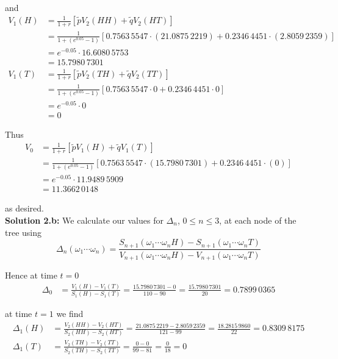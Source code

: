 \documentclass[12pt]{article}
\begin{document}
and
\begin{align*}
	V_1(H) &= \frac{1}{1 + r}[\tilde{p}V_2(HH) + \tilde{q}V_2(HT)] \\
	&= \frac{1}{1 + (e^{0.05} - 1)} [0.7563\,5547 \cdot (21.0875\,2219) + 0.2346\,4451 \cdot (2.8059\,2359) ] \\
	&= e^{-0.05} \cdot 16.6080\,5753 \\
	&= 15.7980\,7301 \\
	V_1(T) &= \frac{1}{1 + r}[\tilde{p}V_2(TH) + \tilde{q}V_2(TT)] \\
	&= \frac{1}{1 + (e^{0.05} - 1)} [0.7563\,5547 \cdot 0 + 0.2346\,4451 \cdot 0] \\
	&= e^{-0.05} \cdot 0 \\
	&= 0
\end{align*}

Thus
\begin{align*}
	V_0 &= \frac{1}{1 + r}[ \tilde{p} V_1(H) + \tilde{q}V_1(T)] \\
	&= \frac{1}{1 + (e^{0.05} - 1)} [0.7563\,5547 \cdot (15.7980\,7301) + 0.2346\,4451 \cdot (0)] \\
	&= e^{-0.05} \cdot 11.9489\,5909 \\
	&= 11.3662\,0148
\end{align*}

as desired. \\

{\bf Solution 2.b:} We calculate our values for $\Delta_n$, $0 \leq n \leq 3$, at each node of the tree using
\begin{equation*}
	\Delta_n(\omega_1\cdots\omega_n) = \frac{ S_{n + 1}(\omega_1\cdots\omega_n H) - S_{n + 1}(\omega_1\cdots\omega_n T) }{ V_{n + 1}(\omega_1\cdots\omega_n H) - V_{n + 1}(\omega_1\cdots\omega_n T) }
\end{equation*}

Hence at time $t = 0$
\begin{align*}
	\Delta_0 &= \frac{V_1(H) - V_1(T)}{S_1(H) - S_1(T)} = \frac{15.7980\,7301 - 0}{110 - 90} = \frac{15.7980\,7301}{20} = 0.7899\,0365
\end{align*}

at time $t = 1$ we find
\begin{align*}
	\Delta_1(H) &= \frac{V_2(HH) - V_2(HT)}{S_2(HH) - S_2(HT)} = \frac{21.0875\,2219 - 2.8059\,2359}{121 - 99} = \frac{18.2815\,9860}{22} = 0.8309\,8175 \\
	\Delta_1(T) &= \frac{V_2(TH) - V_2(TT)}{S_2(TH) - S_2(TT)} = \frac{0 - 0}{99 - 81} = \frac{0}{18} = 0
\end{align*}
\end{document}
